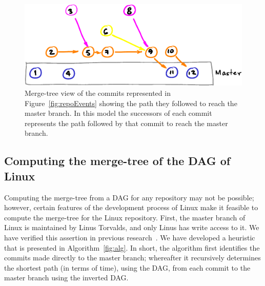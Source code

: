\documentclass[conference, draftclsnofoot, draft]{IEEEtran}
\begin{document}
\begin{figure}[htbp]
        \centering
        \includegraphics[width=\columnwidth]{figures/tree.pdf}
        \caption{Merge-tree view of the commits  represented in
                Figure~\ref{fig:repoEvents} showing the path they followed to reach
                the master branch. In this model the successors of each commit
                represents the path followed by that commit to reach the master
                branch.}
        \label{fig:repoTree}
\end{figure}


\subsection{Computing the merge-tree of the DAG of Linux}

Computing the merge-tree from a DAG for any repository may not be possible; however,
certain features of the development process of Linux make it feasible to compute the
merge-tree for the Linux repository. First, the master branch of Linux is maintained
by Linus Torvalds, and only Linus has write access to it. We have verified this
assertion in previous research~\cite{German2015}. We have developed a heuristic that
is presented in Algorithm~\ref{fig:alg}. In short, the algorithm first identifies
the commits made directly to the master branch; whereafter it recursively determines
the shortest path (in terms of time), using the DAG, from each commit to the master
branch using the inverted DAG.
\end{document}
